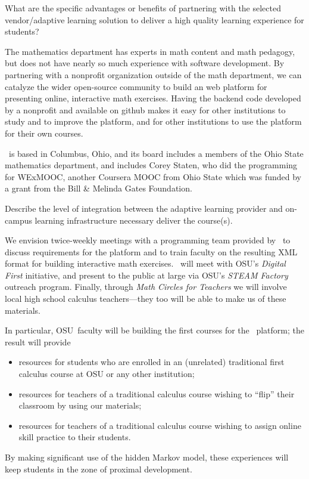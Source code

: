 \begin{subquestion}
 What are the specific advantages or benefits of partnering with the
 selected vendor/adaptive learning solution to deliver a high quality
 learning experience for students?
\end{subquestion}

The mathematics department has experts in math content and math
pedagogy, but does not have nearly so much experience with software
development.  By partnering with a nonprofit organization outside of
the math department, we can catalyze the wider open-source community
to build an web platform for presenting online, interactive math
exercises.  Having the backend code developed by a nonprofit and
available on github makes it easy for other institutions to study and
to improve the platform, and for other institutions to use the
platform for their own courses.

\gratisu\ is based in Columbus, Ohio, and its board includes a members
of the Ohio State mathematics department, and includes Corey Staten,
who did the programming for WExMOOC, another Coursera MOOC from Ohio
State which was funded by a grant from the Bill \& Melinda Gates
Foundation.

\begin{subquestion}
 Describe the level of integration between the adaptive learning
 provider and on-campus learning infrastructure necessary deliver the
 course(s).
\end{subquestion}

We envision twice-weekly meetings with a programming team provided by
\gratisu\ to discuss requirements for the platform and to train
faculty on the resulting XML format for building interactive math
exercises.  \gratisu\ will meet with OSU's \textsl{Digital First}
initiative, and present to the public at large via OSU's
\textsl{STEAM Factory} outreach program.  Finally, through
\textsl{Math Circles for Teachers} we will involve local high school
calculus teachers---they too will be able to make us of these
materials.

In particular, OSU~faculty will be building the first courses for the \gratisu\ platform; the result will provide
\begin{itemize}
\item resources for students who are enrolled in an (unrelated) traditional first calculus course at OSU or any other institution;
\item resources for teachers of a traditional calculus course wishing to ``flip'' their classroom by using our materials;
\item resources for teachers of a traditional calculus course wishing to assign online skill practice to their students.
\end{itemize}
By making significant use of the hidden Markov model, these
experiences will keep students in the zone of proximal development.


